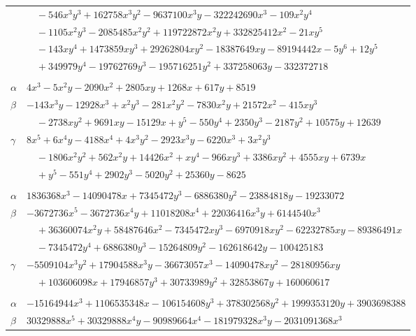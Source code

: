 \documentclass[11pt]{article}
\begin{document}
\begin{longtable}{@{}ll@{}}
 & $\quad -546x^{3}y^{3}+162758x^{3}y^{2}-9637100x^{3}y-322242690x^{3}-109x^{2}y^{4}$\\
 & $\quad -1105x^{2}y^{3}-2085485x^{2}y^{2}+119722872x^{2}y+332825412x^{2}-21xy^{5}$\\
 & $\quad -143xy^{4}+1473859xy^{3}+29262804xy^{2}-18387649xy-89194442x-5y^{6}+12y^{5}$\\
 & $\quad +349979y^{4}-19762769y^{3}-195716251y^{2}+337258063y-332372718$\\
\addlinespace[3pt]
\multicolumn{2}{@{}l}{$\{i,j\}=\{15,141\}$, $k_{ij}=2^{2}\cdot 3\cdot 7\cdot 31^{2}$}\\
$\alpha$ & $4x^{3}-5x^{2}y-2090x^{2}+2805xy+1268x+617y+8519$\\
$\beta$ & $-143x^{3}y-12928x^{3}+x^{2}y^{3}-281x^{2}y^{2}-7830x^{2}y+21572x^{2}-415xy^{3}$\\
 & $\quad -2738xy^{2}+9691xy-15129x+y^{5}-550y^{4}+2350y^{3}-2187y^{2}+10575y+12639$\\
$\gamma$ & $8x^{5}+6x^{4}y-4188x^{4}+4x^{3}y^{2}-2923x^{3}y-6220x^{3}+3x^{2}y^{3}$\\
 & $\quad -1806x^{2}y^{2}+562x^{2}y+14426x^{2}+xy^{4}-966xy^{3}+3386xy^{2}+4555xy+6739x$\\
 & $\quad +y^{5}-551y^{4}+2902y^{3}-5020y^{2}+25360y-8625$\\
\addlinespace[3pt]
\multicolumn{2}{@{}l}{$\{i,j\}=\{15,142\}$, $k_{ij}=2\cdot 3^{2}\cdot 7^{2}\cdot 11\cdot 13\cdot 31^{2}$}\\
$\alpha$ & $1836368x^{3}-14090478x+7345472y^{3}-6886380y^{2}-23884818y-19233072$\\
$\beta$ & $-3672736x^{5}-3672736x^{4}y+11018208x^{4}+22036416x^{3}y+6144540x^{3}$\\
 & $\quad +36360074x^{2}y+58487646x^{2}-7345472xy^{3}-6970918xy^{2}-62232785xy-89386491x$\\
 & $\quad -7345472y^{4}+6886380y^{3}-15264809y^{2}-162618642y-100425183$\\
$\gamma$ & $-5509104x^{3}y^{2}+17904588x^{3}y-36673057x^{3}-14090478xy^{2}-28180956xy$\\
 & $\quad +103606098x+17946857y^{3}+30733989y^{2}+32853867y+160060617$\\
\addlinespace[3pt]
\multicolumn{2}{@{}l}{$\{i,j\}=\{15,145\}$, $k_{ij}=2^{2}\cdot 3^{4}\cdot 5^{2}\cdot 7\cdot 13^{2}\cdot 31^{2}$}\\
$\alpha$ & $-15164944x^{3}+1106535348x-106154608y^{3}+378302568y^{2}+1999353120y+3903698388$\\
$\beta$ & $30329888x^{5}+30329888x^{4}y-90989664x^{4}-181979328x^{3}y-2031091368x^{3}$\\

\end{longtable}
\end{document}
